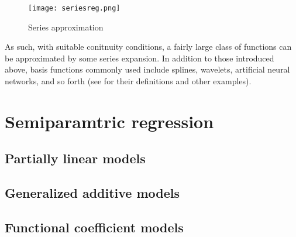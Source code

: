 \documentclass[11pt, A4paper, openany, uplatex]{book}
\begin{document}
\begin{figure}[h!]
	\begin{center}
		\texttt{[image: seriesreg.png]}
		\caption{Series approximation}\label{fig:seriesreg}
	\end{center}
\end{figure}

As such, with suitable conitnuity conditions, a fairly large class of functions can be approximated by some series expansion.
In addition to those introduced above, basis functions commonly used include splines, wavelets, artificial neural networks, and so forth (see \cite{chen2007large} for their definitions and other examples).

\section{Semiparamtric regression}

\subsection{Partially linear models}

\subsection{Generalized additive models}

\subsection{Functional coefficient models}
\end{document}
